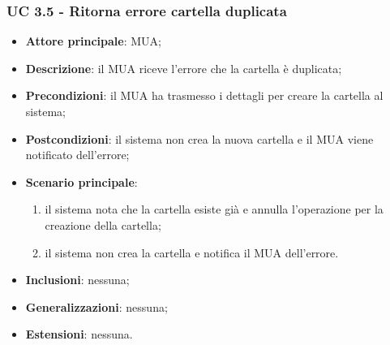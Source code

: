 \subsubsection{UC 3.5 - Ritorna errore cartella duplicata} \label{sec:UC3.5}
    \begin{itemize}
        \item \textbf{Attore principale}: MUA;
        \item \textbf{Descrizione}: il MUA riceve l'errore che la cartella è duplicata;
        \item \textbf{Precondizioni}: il MUA ha trasmesso i dettagli per creare la cartella al sistema;
        \item \textbf{Postcondizioni}: il sistema non crea la nuova cartella e il MUA viene notificato dell'errore;
        \item \textbf{Scenario principale}:
            \begin{enumerate}
                \item il sistema nota che la cartella esiste già e annulla l'operazione per la creazione della cartella;
                \item il sistema non crea la cartella e notifica il MUA dell'errore.
            \end{enumerate}
        \item \textbf{Inclusioni}: nessuna;
        \item \textbf{Generalizzazioni}: nessuna;
        \item \textbf{Estensioni}: nessuna.
    \end{itemize}

